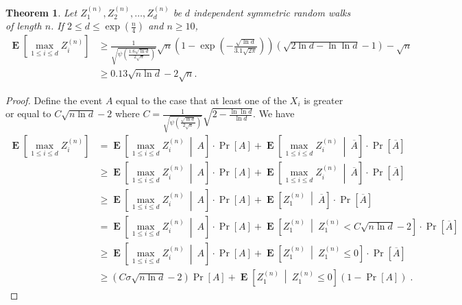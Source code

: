 \documentclass{article}
\DeclareMathOperator*{\Exp}{\mathbf{E}}
\newtheorem{theorem}{Theorem}
\begin{document}
\begin{theorem}
\label{theorem:maximum-of-random-walks}
Let $Z^{(n)}_1, Z^{(n)}_2, \dots, Z^{(n)}_d$ be $d$ independent symmetric random walks of length $n$. If $2 \le d \le \exp(\frac{n}{4})$ and $n\ge 10$,
\begin{align*}
\Exp \left[ \max_{1 \le i \le d} Z^{(n)}_i \right]
& \ge \frac{1}{\sqrt{\psi\left(\frac{1.6\sqrt{\ln d}}{2 \sqrt{n}}\right)}}\sqrt{n}\left(1 - \exp\left(-\frac{\sqrt{\ln d}}{3.1 \sqrt{2\pi}}\right)\right) \left(\sqrt{2 \ln d -\ln \ln d}-1\right) -\sqrt{n} \\
& \ge 0.13 \sqrt{n \ln d} - 2 \sqrt{n}.
\end{align*}
\end{theorem}

\begin{proof}
Define the event $A$ equal to the case that at least one of the $X_i$ is greater or equal to $C \sqrt{n \ln d}-2$ where $C=\frac{1}{\sqrt{\psi\left(\frac{\sqrt{\ln d}}{2 \sqrt{n}}\right)}}\sqrt{2-\frac{\ln \ln d}{\ln d}}$.
We have
\begin{align*}
\Exp \left[ \max_{1 \le i \le d} Z^{(n)}_i \right]
& = \Exp \left[ \max_{1 \le i \le d} Z^{(n)}_i ~ \middle|~ A \right] \cdot \Pr[A] + \Exp \left[ \max_{1 \le i \le d} Z^{(n)}_i ~\middle|~ \overline{A} \right] \cdot \Pr \left[ \overline{A} \right] \\
& \ge \Exp \left[ \max_{1 \le i \le d} Z^{(n)}_i ~\middle|~ A \right] \cdot \Pr[A] + \Exp \left[ \max_{1 \le i \le d} Z^{(n)}_i ~\middle|~ \overline{A} \right] \cdot \Pr \left[ \overline{A} \right]\\
& \ge \Exp \left[ \max_{1 \le i \le d} Z^{(n)}_i ~\middle|~ A \right] \cdot \Pr[A] + \Exp\left[ Z^{(n)}_1 ~\middle|~ \overline{A} \right] \cdot \Pr \left[ \overline{A} \right] \\
& = \Exp \left[ \max_{1 \le i \le d} Z^{(n)}_i ~\middle|~ A \right] \cdot \Pr[A] + \Exp \left[ Z^{(n)}_1 ~\middle|~ Z^{(n)}_1 < C \sqrt{n \ln d} - 2 \right] \cdot \Pr \left[ \overline{A} \right]\\
& \ge \Exp \left[ \max_{1 \le i \le d} Z^{(n)}_i ~\middle|~ A \right] \cdot \Pr[A] + \Exp \left[ Z^{(n)}_1 ~\middle|~ Z^{(n)}_1 \le 0 \right] \cdot \Pr \left[ \overline{A} \right] \\
& \ge (C \sigma \sqrt{n \ln d} - 2) \Pr[A] + \Exp \left[ Z^{(n)}_1 ~\middle|~ Z^{(n)}_1 \le 0 \right] (1 - \Pr[A]) \; .
\end{align*}


\end{proof}
\end{document}
